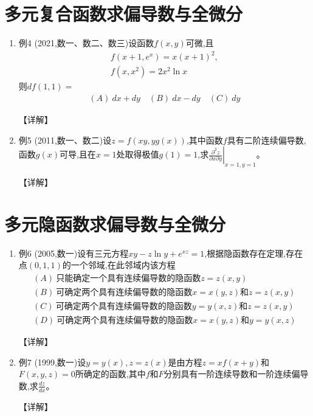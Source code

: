 \documentclass[12pt, a4paper, oneside, UTF8]{ctexbook}
\begin{document}
\section{多元复合函数求偏导数与全微分}

\begin{enumerate}[label=\arabic*.,start=4]
    \item 例4 (2021,数一、数二、数三)设函数$f(x,y)$可微,且
    \begin{align*}
        f(x+1,e^x)=x(x+1)^2, \\
        f(x,x^2)=2x^2\ln x
    \end{align*}
    则$df(1,1)=$
    \begin{align*}
        (A)\ dx+dy \quad (B)\ dx-dy \quad (C)\ dy
    \end{align*}
    
    \begin{solution}
    【详解】
    \end{solution}
    
    \item 例5 (2011,数一、数二)设$z=f(xy,yg(x))$,其中函数$f$具有二阶连续偏导数,函数$g(x)$可导,且在$x=1$处取得极值$g(1)=1$,求$\left.\frac{\partial^2 z}{\partial x\partial y}\right|_{x=1,y=1}$。
    
    \begin{solution}
    【详解】
    \end{solution}
\end{enumerate}

\section{多元隐函数求偏导数与全微分}

\begin{enumerate}[label=\arabic*.,start=6]
    \item 例6 (2005,数一)设有三元方程$xy-z\ln y+e^{xz}=1$,根据隐函数存在定理,存在点$(0,1,1)$的一个邻域,在此邻域内该方程
    \begin{align*}
        (A)\ \text{只能确定一个具有连续偏导数的隐函数}z=z(x,y) \\
        (B)\ \text{可确定两个具有连续偏导数的隐函数}x=x(y,z)\text{和}z=z(x,y) \\
        (C)\ \text{可确定两个具有连续偏导数的隐函数}y=y(x,z)\text{和}z=z(x,y) \\
        (D)\ \text{可确定两个具有连续偏导数的隐函数}x=x(y,z)\text{和}y=y(x,z)
    \end{align*}
    
    \begin{solution}
    【详解】
    \end{solution}
    
    \item 例7 (1999,数一)设$y=y(x),z=z(x)$是由方程$z=xf(x+y)$和$F(x,y,z)=0$所确定的函数,其中$f$和$F$分别具有一阶连续导数和一阶连续偏导数,求$\frac{dz}{dx}$。
    
    \begin{solution}
    【详解】
    \end{solution}
\end{enumerate}
\end{document}
